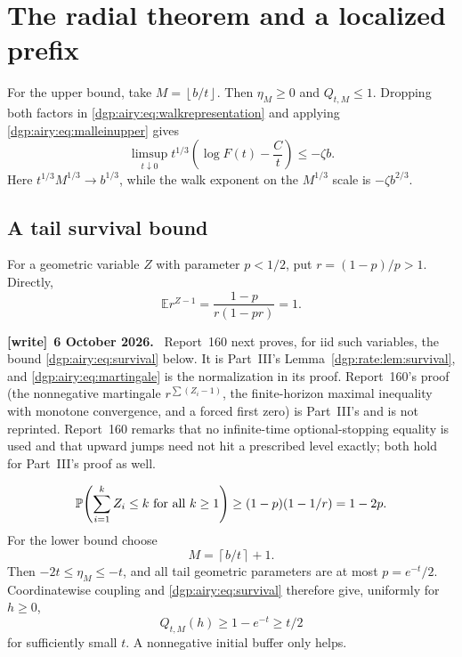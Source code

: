 \documentclass[11pt,letterpaper]{article}
\numberwithin{equation}{section}
\theoremstyle{remark}\newtheorem{remark}[theorem]{Remark}
\newcommand{\PP}{\mathbb P}
\newcommand{\EE}{\mathbb E}
\newcommand{\floor}[1]{\left\lfloor #1\right\rfloor}
\newcommand{\ceil}[1]{\left\lceil #1\right\rceil}
\newenvironment{writenote}[1][]{\par\smallskip\begingroup\small
 \noindent\textbf{[write]}\if\relax\detokenize{#1}\relax\else~\textbf{#1.}\fi\ }%
 {\par\endgroup\smallskip}
\begin{document}
\section{The radial theorem and a localized prefix}\label{dgp:airy:sec:radial}
For the upper bound, take $M=\floor{b/t}$. Then $\eta_M\geq0$ and
$Q_{t,M}\leq1$. Dropping both factors in \eqref{dgp:airy:eq:walkrepresentation}
and applying \eqref{dgp:airy:eq:malleinupper} gives
\[
 \limsup_{t\downarrow0}t^{1/3}
       \left(\log F(t)-\frac Ct\right)\leq-\zeta b.
\]
Here $t^{1/3}M^{1/3}\to b^{1/3}$, while the walk exponent on the
$M^{1/3}$ scale is $-\zeta b^{2/3}$.

\subsection{A tail survival bound}
For a geometric variable $Z$ with parameter $p<1/2$, put
$r=(1-p)/p>1$. Directly,
\begin{equation}\label{dgp:airy:eq:martingale}
 \EE r^{Z-1}=\frac{1-p}{r(1-pr)}=1.
\end{equation}
\begin{writenote}[6 October 2026]
Report~160 next proves, for iid such variables, the bound \eqref{dgp:airy:eq:survival} below. It is Part~III's Lemma~\ref{dgp:rate:lem:survival}, and \eqref{dgp:airy:eq:martingale} is the normalization in its proof. Report~160's proof (the nonnegative martingale $r^{\sum(Z_i-1)}$, the finite-horizon maximal inequality with monotone convergence, and a forced first zero) is Part~III's and is not reprinted. Report~160 remarks that no infinite-time optional-stopping equality is used and that upward jumps need not hit a prescribed level exactly; both hold for Part~III's proof as well.
\end{writenote}
\begin{equation}\label{dgp:airy:eq:survival}
 \PP\!\left(\sum_{i=1}^kZ_i\leq k\ \hbox{for all }k\geq1\right)
 \geq(1-p)(1-1/r)=1-2p.
\end{equation}
For the lower bound choose
\begin{equation}\label{dgp:airy:eq:lowercutoff}
 M=\ceil{b/t}+1.
\end{equation}
Then $-2t\leq\eta_M\leq-t$, and all tail geometric parameters are at
most $p=e^{-t}/2$. Coordinatewise coupling and \eqref{dgp:airy:eq:survival}
therefore give, uniformly for $h\geq0$,
\begin{equation}\label{dgp:airy:eq:tailsurvival}
 Q_{t,M}(h)\geq1-e^{-t}\geq t/2
\end{equation}
for sufficiently small $t$. A nonnegative initial buffer only helps.
\end{document}
